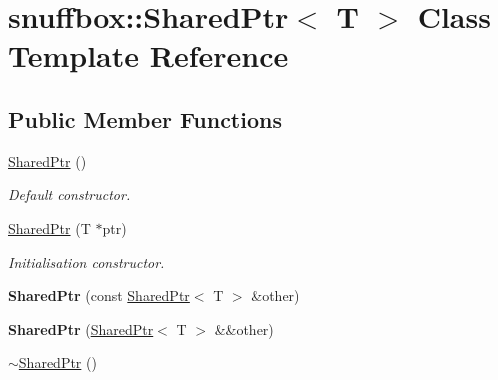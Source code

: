 \hypertarget{classsnuffbox_1_1_shared_ptr}{\section{snuffbox\-:\-:Shared\-Ptr$<$ T $>$ Class Template Reference}
\label{classsnuffbox_1_1_shared_ptr}
}
\subsection*{Public Member Functions}
\begin{DoxyCompactItemize}
\item 
\hypertarget{classsnuffbox_1_1_shared_ptr_ab1de15b7502bcad3bd9c7bf82a2a98e7}{\hyperlink{classsnuffbox_1_1_shared_ptr_ab1de15b7502bcad3bd9c7bf82a2a98e7}{Shared\-Ptr} ()}\label{classsnuffbox_1_1_shared_ptr_ab1de15b7502bcad3bd9c7bf82a2a98e7}

\begin{DoxyCompactList}\small\item\em Default constructor. \end{DoxyCompactList}\item 
\hypertarget{classsnuffbox_1_1_shared_ptr_a9b286960622fc23a06f6e2e8b2ed8663}{\hyperlink{classsnuffbox_1_1_shared_ptr_a9b286960622fc23a06f6e2e8b2ed8663}{Shared\-Ptr} (T $\ast$ptr)}\label{classsnuffbox_1_1_shared_ptr_a9b286960622fc23a06f6e2e8b2ed8663}

\begin{DoxyCompactList}\small\item\em Initialisation constructor. \end{DoxyCompactList}\item 
\hypertarget{classsnuffbox_1_1_shared_ptr_a521e70c28535569af7fbe115dd889ccd}{{\bfseries Shared\-Ptr} (const \hyperlink{classsnuffbox_1_1_shared_ptr}{Shared\-Ptr}$<$ T $>$ \&other)}\label{classsnuffbox_1_1_shared_ptr_a521e70c28535569af7fbe115dd889ccd}

\item 
\hypertarget{classsnuffbox_1_1_shared_ptr_a00f79a79261083ccd63d4b57e2046417}{{\bfseries Shared\-Ptr} (\hyperlink{classsnuffbox_1_1_shared_ptr}{Shared\-Ptr}$<$ T $>$ \&\&other)}\label{classsnuffbox_1_1_shared_ptr_a00f79a79261083ccd63d4b57e2046417}

\item 
\hypertarget{classsnuffbox_1_1_shared_ptr_ad8940a1b8cb67b76d5a626dbab64a04d}{\hyperlink{classsnuffbox_1_1_shared_ptr_ad8940a1b8cb67b76d5a626dbab64a04d}{$\sim$\-Shared\-Ptr} ()}\label{classsnuffbox_1_1_shared_ptr_ad8940a1b8cb67b76d5a626dbab64a04d}


\end{DoxyCompactItemize}
